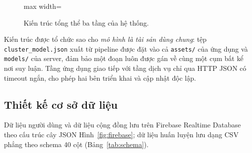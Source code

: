\begin{figure}[h!]
\begin{adjustbox}{max width=\textwidth}
 \end{adjustbox}
\caption{Kiến trúc tổng thể ba tầng của hệ thống.}
\label{fig:arch}
\end{figure}

Kiến trúc được tổ chức sao cho \textit{mô hình là tài sản dùng chung}: tệp \texttt{cluster\_model.json} xuất từ pipeline được đặt vào cả \texttt{assets/} của ứng dụng và \texttt{models/} của server, đảm bảo một đoạn luôn được gán về cùng một cụm bất kể nơi suy luận. Tầng ứng dụng giao tiếp với tầng dịch vụ chỉ qua HTTP JSON có timeout ngắn, cho phép hai bên triển khai và cập nhật độc lập.

\subsection{Thiết kế cơ sở dữ liệu}
Dữ liệu người dùng và dữ liệu cộng đồng lưu trên Firebase Realtime Database theo cấu trúc cây JSON Hình~\ref{fig:firebase}; dữ liệu huấn luyện lưu dạng CSV phẳng theo schema 40 cột (Bảng~\ref{tab:schema}).

